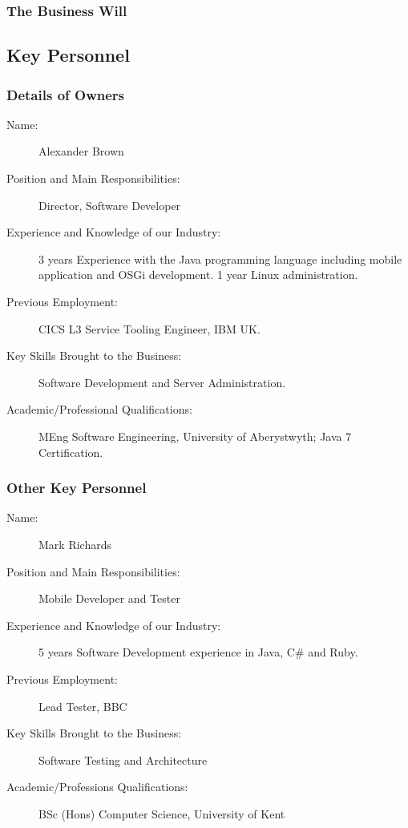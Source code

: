 \documentclass[DIV=calc, paper=a4, fontsize=11pt]{scrartcl}	 %
\begin{document}
\subsubsection*{The Business Will}


\subsection{Key Personnel}
\subsubsection*{Details of Owners}
\begin{description}
\item[Name:] Alexander Brown
\item[Position and Main Responsibilities:] Director, Software Developer
\item[Experience and Knowledge of our Industry:] 3 years Experience with the Java programming 
language including mobile application and OSGi development. 1 year Linux administration. %
\item[Previous Employment:] CICS L3 Service Tooling Engineer, IBM UK.
\item[Key Skills Brought to the Business:] Software Development and Server Administration.
\item[Academic/Professional Qualifications:] MEng Software Engineering, University of Aberystwyth; 
Java 7 Certification.
\end{description}

\subsubsection*{Other Key Personnel}
\begin{description}
\item[Name:] Mark Richards
\item[Position and Main Responsibilities:] Mobile Developer and Tester
\item[Experience and Knowledge of our Industry:] 5 years Software Development experience in Java, 
C\# and Ruby.
\item[Previous Employment:] Lead Tester, BBC
\item[Key Skills Brought to the Business:] Software Testing and Architecture
\item[Academic/Professions Qualifications:] BSc (Hons) Computer Science, University of Kent
\end{description}
\end{document}
